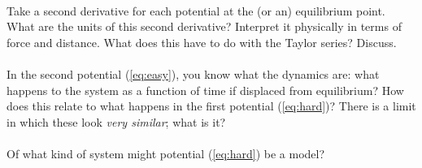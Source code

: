 \documentclass[12pt]{article}
\begin{document}
\paragraph{\theproblem}%
Take a second derivative for each potential at the (or an) equilibrium point.
What are the units of this second derivative?  Interpret it physically
in terms of force and distance. What does this have to do with the
Taylor series? Discuss.

\paragraph{\theproblem}%
In the second potential (\ref{eq:easy}), you know what the dynamics
are: what happens to the system as a function of time if displaced
from equilibrium?  How does this relate to what happens in the first
potential (\ref{eq:hard})?  There is a limit in which these look
\emph{very similar}; what is it?

\paragraph{\theproblem}%
Of what kind of system might potential (\ref{eq:hard}) be a model?
\end{document}
